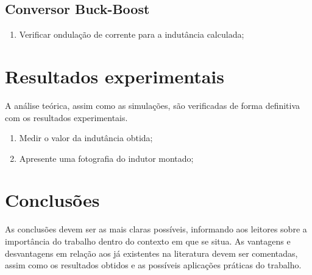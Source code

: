 \subsection{Conversor Buck-Boost}
\begin{enumerate}	
	\item Verificar ondulação de corrente para a indutância calculada; 	
\end{enumerate}



\section{Resultados experimentais}
A análise teórica, assim como as simulações, são verificadas de forma definitiva com os resultados experimentais.
\begin{enumerate}									
	\item  Medir o valor da indutância obtida;
	\item  Apresente uma fotografia do indutor montado;
\end{enumerate}

\section{Conclusões} 


As conclusões devem ser as mais claras possíveis, informando aos leitores sobre a importância do trabalho dentro do contexto em que se situa. As vantagens e desvantagens em relação aos já existentes na literatura devem ser comentadas, assim como os resultados obtidos e as possíveis aplicações práticas do trabalho.





\balance


